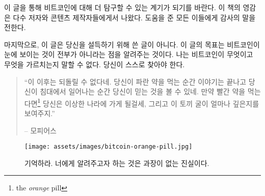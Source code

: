 이 글을 통해 비트코인에 대해 더 탐구할 수 있는 계기가 되기를 바란다. 이 책의 영감은 다수 저자와
콘텐츠 제작자들에게서 나왔다. 도움을 준 모든 이들에게 감사의 말을 전한다.

마지막으로, 이 글은 당신을 설득하기 위해 쓴 글이 아니다. 이 글의 목표는 비트코인이 눈에 보이는 것이
전부가 아니라는 점을 알려주는 것이다. 나는 비트코인이 무엇이고 무엇을 가르치는지 말할 수 없다. 당신이 스스로
찾아야 한다.

\begin{quotation}\begin{samepage}
\enquote{이 이후는 되돌릴 수 없다네. 당신이 파란 약을 먹는 순간 이야기는 끝나고 당신이 침대에서 일어나는 순간
당신이 믿는 것을 볼 수 있네. 만약 빨간 약을 먹는다면\footnote{the \textit{orange} pill} 당신은 이상한 나라에 가게 될걸세, 
그리고 이 토끼 굴이 얼마나 깊은지를 보여주지.}
\begin{flushright} -- 모피어스
\end{flushright}\end{samepage}\end{quotation}

\begin{figure}
  \texttt{[image: assets/images/bitcoin-orange-pill.jpg]}
  \caption*{기억하라. 너에게 알려주고자 하는 것은 과장이 없는 진실이다.}
  \label{fig:bitcoin-orange-pill}
\end{figure}

%
%
%

